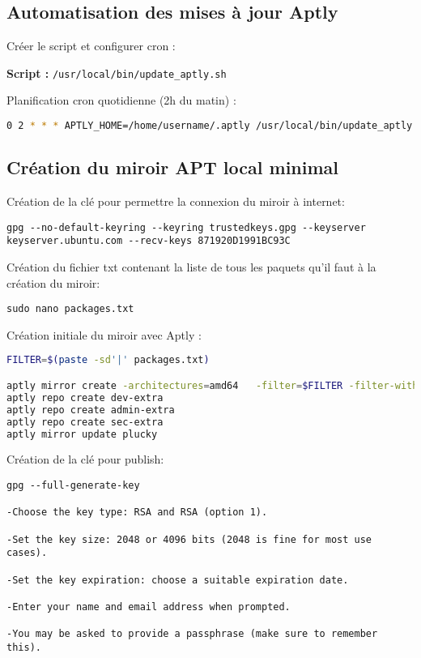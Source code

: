 \documentclass[a4paper,12pt]{article}
\begin{document}
\subsection{Automatisation des mises à jour Aptly}

Créer le script et configurer cron :

\textbf{Script :} \texttt{/usr/local/bin/update\_aptly.sh}

Planification cron quotidienne (2h du matin) :

\begin{lstlisting}[language=bash]
0 2 * * * APTLY_HOME=/home/username/.aptly /usr/local/bin/update_aptly.sh >> /var/log/aptly-update.log 2>&1
\end{lstlisting}

\subsection{Création du miroir APT local minimal}
Création de la clé pour permettre la connexion du miroir à internet:
\begin{lstlisting}
gpg --no-default-keyring --keyring trustedkeys.gpg --keyserver keyserver.ubuntu.com --recv-keys 871920D1991BC93C
\end{lstlisting}

Création du fichier txt contenant la liste de tous les paquets qu'il faut à la création du miroir:
\begin{lstlisting}
sudo nano packages.txt
\end{lstlisting}

Création initiale du miroir avec Aptly :

\begin{lstlisting}[language=bash]
FILTER=$(paste -sd'|' packages.txt)

aptly mirror create -architectures=amd64   -filter=$FILTER -filter-with-deps plucky http://archive.ubuntu.com/ubuntu plucky
aptly repo create dev-extra
aptly repo create admin-extra
aptly repo create sec-extra
aptly mirror update plucky
\end{lstlisting}

Création de la clé pour publish:
\begin{lstlisting}
gpg --full-generate-key
 
-Choose the key type: RSA and RSA (option 1).

-Set the key size: 2048 or 4096 bits (2048 is fine for most use cases).

-Set the key expiration: choose a suitable expiration date.

-Enter your name and email address when prompted.

-You may be asked to provide a passphrase (make sure to remember this).
\end{lstlisting}
\end{document}
